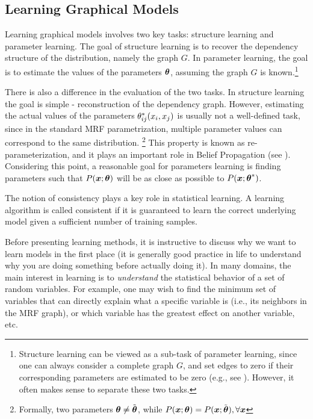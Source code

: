 \subsection{Learning Graphical Models}
\label{sec:learning}
Learning graphical models involves two key tasks: structure learning and parameter learning.
The goal of structure learning is to recover the dependency structure of the distribution, namely the graph $G$.
In parameter learning, the goal is to estimate the values of the parameters $\boldsymbol{\theta}$, assuming the graph $G$ is known.\footnote{Structure learning can be viewed as a sub-task of parameter learning, since one can always consider a complete graph $G$, and set edges to zero if their corresponding parameters are estimated to be zero (e.g., see \cite{ravikumar2010high}). However, it often makes sense to separate these two tasks.}

There is also a difference in the evaluation of the two tasks.
In structure learning the goal is simple - reconstruction of the dependency graph.
However, estimating the actual values of the parameters ${\theta}^{*}_{ij}(x_i,x_j)$ is usually not a well-defined task, since in the standard MRF parametrization, multiple 
parameter values can correspond to the same distribution. \footnote{Formally, two parameters $\boldsymbol{\theta} \neq \tilde{\boldsymbol{\theta}}$, while $P(\boldsymbol{x}; \boldsymbol{\theta}) = P(\boldsymbol{x}; \tilde{\boldsymbol{\theta}}), \forall \boldsymbol{x}$}
This property is known as re-parameterization, and it plays an important role in Belief Propagation (see ). Considering this point, a reasonable goal for parameters learning is finding parameters such that $P(\boldsymbol{x};\boldsymbol{\theta})$ will be as close as possible to $P(\boldsymbol{x};{\boldsymbol{\theta}}^{*})$. 

The notion of consistency plays a key role in statistical learning. A learning algorithm is called consistent if it is guaranteed to learn the correct underlying model given a sufficient number of training samples. 

Before presenting learning methods, it is instructive to discuss why we want to learn models in the first place (it is generally good practice in life to understand why you are doing something before actually doing it). 
In many domains, the main interest in learning is to {\em understand} the statistical behavior of a set of random variables.
For example, one may wish to find the minimum set of variables that can directly explain what a specific variable is (i.e., its neighbors in the MRF graph), or which variable has the greatest effect on another variable, etc.

